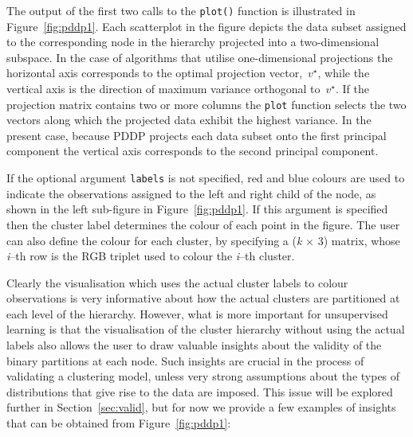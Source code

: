 \documentclass{book}
\begin{document}
\noindent
%
The output of the first two calls to the {\tt plot()} function is illustrated in
Figure~\ref{fig:pddp1}.
%
Each scatterplot in the figure depicts the data subset assigned to
the corresponding node in the hierarchy projected into a two-dimensional
subspace. In the case of algorithms that utilise one-dimensional projections
the horizontal axis corresponds to the optimal projection vector,~$v^\star$,
while the vertical axis is the direction of maximum variance orthogonal to~$v^\star$.
%
If the projection matrix contains two or more columns the {\tt plot} function
selects the two vectors along which the projected data exhibit the highest variance.
%
In the present case, because PDDP projects each data subset onto the first
principal component the vertical axis corresponds to the second principal component.

If the optional argument {\tt labels} is not specified, red and blue colours are used to
indicate the observations assigned to the left and right child of the node,
as shown in the left sub-figure in Figure~\ref{fig:pddp1}.
%
If this argument is specified then the cluster label determines
the colour of each point in the figure.
%
The user can also define the colour for each cluster, by specifying
a ({\it k} $\times$ 3) matrix, whose {\it i}--th row is the RGB triplet used to colour
the {\it i}--th cluster.



Clearly the visualisation which uses the actual cluster labels to colour
observations is very informative about how the actual clusters are partitioned
at each level of the hierarchy.
%
However, what is more important for unsupervised learning is that the
visualisation of the cluster hierarchy without using the actual labels also
allows the user to draw valuable insights about the validity of the binary
partitions at each node. Such insights are crucial in the process of validating
a clustering model, unless very strong assumptions about the types of
distributions that give rise to the data are imposed. This issue will be
explored further in Section~\ref{sec:valid}, but for now we provide a few
examples of insights that can be obtained from Figure~\ref{fig:pddp1}: 
\end{document}
